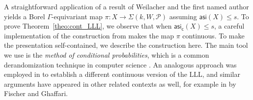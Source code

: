\documentclass[11pt,reqno,psamsfonts]{amsart}
\theoremstyle{bfnote}
\theoremstyle{definition}
\theoremstyle{remark}
\newcommand{\0}{\varnothing}
\renewcommand{\leq}{\leqslant}
\newcommand{\G}{\Gamma}
\newcommand{\asi}{\mathsf{asi}}
\newcommand{\casi}{\asi_{\mathsf{c}}}
\numberwithin{equation}{section}
\begin{document}
    A straightforward application of a result of Weilacher and the first named author \cite[Thm.~1.29]{BW} %
    yields a {Borel} $\G$-equivariant map $\pi \colon X \to \Sigma(k,W,\mathcal{P})$ assuming $\asi(X) \leq s$. To prove Theorem~\ref{theo:cont_LLL}, we observe that when $\casi(X) \leq s$, a careful implementation of the construction from \cite{BW} %
        makes the map $\pi$ continuous.
        To make the presentation self-contained, we describe the construction here. The main tool we use is the \emph{method of conditional probabilities}, which is a common derandomization technique in computer science %
        \cites[\S16]{AS}[\S5.6]{RandAlg}. An analogous approach was employed in \cite{Ber_cont} to establish a different continuous version of the LLL, and similar arguments have appeared in other related contexts as well, for example in \cite[Thm.~3.6]{FG} by Fischer and Ghaffari.
    
\end{document}
